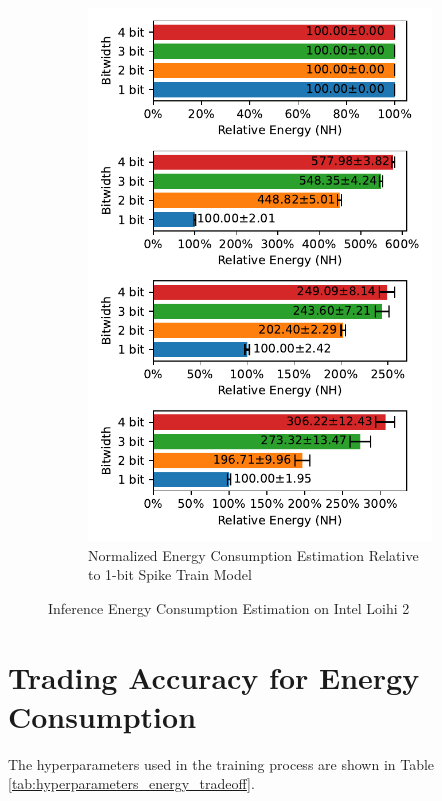 \begin{figure}[H]
\begin{subfigure}[H]{0.495\textwidth}
                \includegraphics[width=\textwidth]{../standard/CIFAR10/plots/cifar10_test_relative_energy_nh.pdf}
                \caption{Normalized Energy Consumption Estimation Relative to 1-bit Spike Train Model}
            \end{subfigure}
            \caption{Inference Energy Consumption Estimation on Intel Loihi 2}
        \end{figure}

\section{Trading Accuracy for Energy Consumption}
\label{appendix:energy_tradeoff}

    The hyperparameters used in the training process are shown in Table \ref{tab:hyperparameters_energy_tradeoff}.

